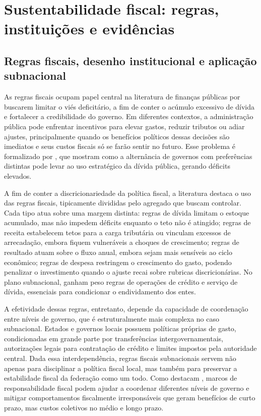 \chapter{Sustentabilidade fiscal: regras, instituições e evidências}
\label{chap:revisao}

\section{Regras fiscais, desenho institucional e aplicação subnacional}
\label{sec:regras}

As regras fiscais ocupam papel central na literatura de finanças públicas por buscarem limitar o viés deficitário, a fim de conter o acúmulo excessivo de dívida e fortalecer a credibilidade do governo. Em diferentes contextos, a administração pública pode enfrentar incentivos para elevar gastos, reduzir tributos ou adiar ajustes, principalmente quando os benefícios políticos dessas decisões são imediatos e seus custos fiscais só se farão sentir no futuro. Esse problema é formalizado por , que mostram como a alternância de governos com preferências distintas pode levar ao uso estratégico da dívida pública, gerando déficits elevados.

A fim de conter a discricionariedade da política fiscal, a literatura destaca o uso das regras fiscais, tipicamente divididas pelo agregado que buscam controlar. Cada tipo atua sobre uma margem distinta: regras de dívida limitam o estoque acumulado, mas não impedem déficits enquanto o teto não é atingido; regras de receita estabelecem tetos para a carga tributária ou vinculam excessos de arrecadação, embora fiquem vulneráveis a choques de crescimento; regras de resultado atuam sobre o fluxo anual, embora sejam mais sensíveis ao ciclo econômico; regras de despesa restringem o crescimento do gasto, podendo penalizar o investimento quando o ajuste recai sobre rubricas discricionárias. No plano subnacional, ganham peso regras de operações de crédito e serviço de dívida, essenciais para condicionar o endividamento dos entes.

A efetividade dessas regras, entretanto, depende da capacidade de coordenação entre níveis de governo, que é estruturalmente mais complexa no caso subnacional. Estados e governos locais possuem políticas próprias de gasto, condicionadas em grande parte por transferências intergovernamentais, autorizações legais para contratação de crédito e limites impostos pela autoridade central. Dada essa interdependência, regras fiscais subnacionais servem não apenas para disciplinar a política fiscal local, mas também para preservar a estabilidade fiscal da federação como um todo. Como destacam , marcos de responsabilidade fiscal podem ajudar a coordenar diferentes níveis de governo e mitigar comportamentos fiscalmente irresponsáveis que geram benefícios de curto prazo, mas custos coletivos no médio e longo prazo.

